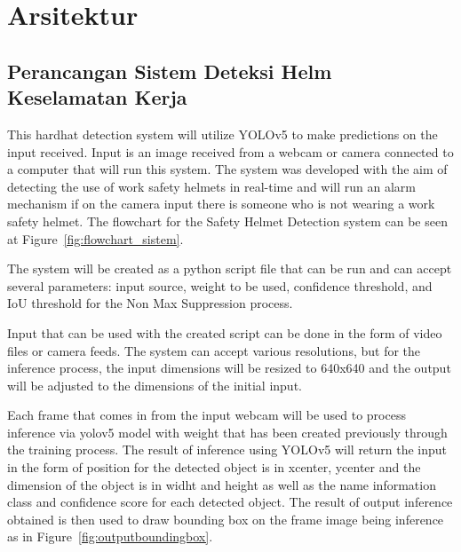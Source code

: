 \section{Arsitektur}
\label{sec:arsitektur}


\subsection{Perancangan Sistem Deteksi Helm Keselamatan Kerja}
\label{subsec:perancangansistemdeteksihelmkeselamatankerja}

\par This hardhat detection system will utilize YOLOv5 to make 
predictions on the input received. Input is an image received from a 
webcam or camera connected to a computer that will run this system. 
The system was developed with the aim of detecting the use of work 
safety helmets in real-time and will run an alarm mechanism if on the 
camera input there is someone who is not wearing a work safety helmet. 
The flowchart for the Safety Helmet Detection system can be seen at Figure~\ref{fig:flowchart_sistem}.


\par The system will be created as a python script file that can be run and can accept several parameters: 
input source, weight to be used, confidence threshold, and IoU threshold for the Non Max Suppression process.
\par Input that can be used with the created script can be done in the form of video files or camera feeds.
The system can accept various resolutions, but for the inference process, the input dimensions will 
be resized to 640x640 and the output will be adjusted to the dimensions of the initial input.

\par Each frame that comes in from the input webcam will be used to process inference via
yolov5 model with weight that has been created previously through the training process.
The result of inference using YOLOv5 will return the input in the form of position for
the detected object is in xcenter, ycenter and the dimension of the object is in widht
and height as well as the name information class and confidence score for
each detected object. The result of output inference obtained is then used to draw
bounding box on the frame image being inference
as in Figure~\ref{fig:outputboundingbox}.

